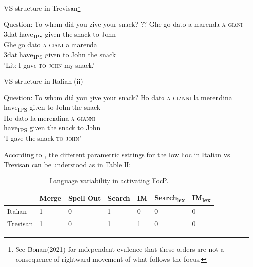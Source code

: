 \documentclass[fleqn,10pt]{wlscirep}
\begin{document}
\begin{exe}
    \ex VS structure in Trevisan\footnote{See Bonan(2021) for independent evidence that these orders are not a consequence of rightward movement of what follows the focus.}
        \begin{xlist}
            \ex Question: To whom did you give your snack?
            \ex \gll ?? Ghe go dato a marenda \textsc{a} \textsc{giani}\\
            {} 3dat have\textsubscript{1PS} given the snack to John\\
            \ex \gll Ghe go dato \textsc{a} \textsc{giani} a marenda\\
            3dat have\textsubscript{1PS} given to John the snack\\
            \glt 'Lit: I gave \textsc{to} \textsc{john} my snack.'
        \end{xlist}
\end{exe}

\begin{exe}
    \ex VS structure in Italian (ii)
        \begin{xlist}
            \ex Question: To whom did you give your snack?
            \ex \gll * Ho dato \textsc{a} \textsc{gianni} la merendina\\
            {} have\textsubscript{1PS} given to John the snack\\
            \ex \gll Ho dato la merendina \textsc{a} \textsc{gianni}\\
            have\textsubscript{1PS} given the snack to John\\
            \glt 'I gave the snack \textsc{to} \textsc{john}'
        \end{xlist}
\end{exe}

According to \citet{bonan22}, the different parametric settings for the low Foc in Italian vs Trevisan can be understood as in Table II:

\begin{table}[ht]
    \centering
    \begin{tabular}{|l|l|l|l|l|l|l|}
    \hline
     & Merge & Spell Out & Search & IM & Search\textsubscript{lex} & IM\textsubscript{lex} \\
    \hline
    Italian & 1 & 0 & 1 & 0 & 0 & 0 \\
    \hline
    Trevisan & 1 & 0 & 1 & 1 & 0 & 0\\
    \hline
    \end{tabular}
    \caption{\label{tab:samp2}Language variability in activating FocP.}
    \end{table}
\end{document}
